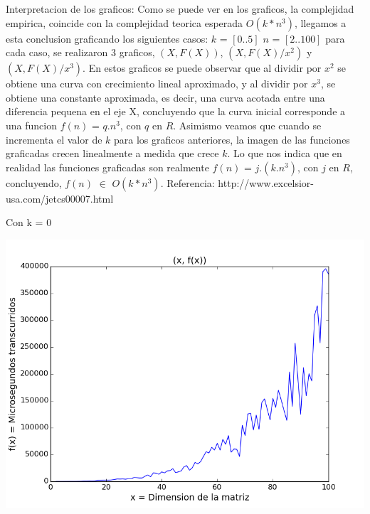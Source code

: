 Interpretacion de los graficos: Como se puede ver en los graficos, la complejidad empirica, coincide con la complejidad teorica esperada $O(k*n^3)$, llegamos a esta conclusion graficando los siguientes casos: $k$ = $[0..5]$ $n$ = $[2..100]$ para cada caso, se realizaron 3 graficos, $(X,F(X))$,  $(X,F(X)/x^2)$ y $(X,F(X)/x^3)$. En estos graficos se puede observar que al dividir por $x^2$ se obtiene una curva con crecimiento lineal aproximado, y al dividir por $x^3$, se obtiene una constante aproximada, es decir, una curva acotada entre una diferencia pequena en el eje X, concluyendo que la curva inicial corresponde a una funcion $f(n)$ = $q.n^3$, con $q$ en $R$. Asimismo veamos que cuando se incrementa el valor de $k$ para los graficos anteriores, la imagen de las funciones graficadas crecen linealmente a medida que crece $k$. Lo que nos indica que en realidad las funciones graficadas son realmente $f(n)$ = $j.(k.n^3)$, con $j$ en $R$, concluyendo, $f(n)$ $\in$ $O(k*n^3)$. Referencia: http://www.excelsior-usa.com/jetcs00007.html

\vspace{2mm}

Con k = 0

\begin{center}
\includegraphics[scale=0.54]{images/0potenciafuncion}
\end{center}


